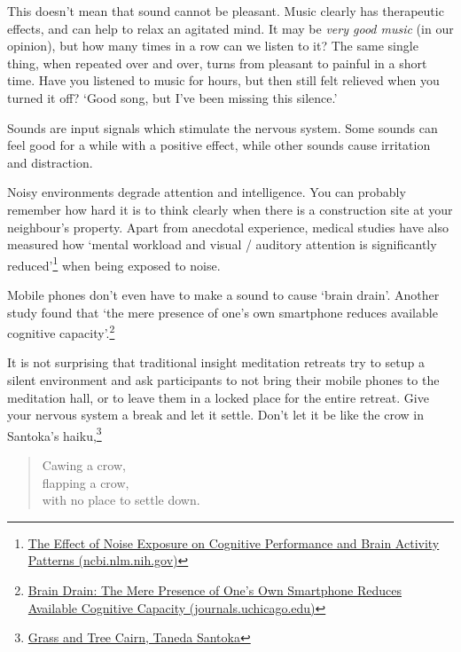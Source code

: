 
\noindent This doesn't mean that sound cannot be pleasant. Music clearly
has therapeutic effects, and can help to relax an agitated mind. It may
be \emph{very good music} (in our opinion), but how many times in a row
can we listen to it? The same single thing, when repeated over and over,
turns from pleasant to painful in a short time. Have you listened to
music for hours, but then still felt relieved when you turned it off?
`Good song, but I've been missing this silence.'

Sounds are input signals which stimulate the nervous system. Some sounds
can feel good for a while with a positive effect, while other sounds
cause irritation and distraction.

Noisy environments degrade attention and intelligence. You can probably
remember how hard it is to think clearly when there is a construction
site at your neighbour's property. Apart from anecdotal experience,
medical studies have also measured how `mental workload and visual /
auditory attention is significantly reduced'\footnote{\href{https://www.ncbi.nlm.nih.gov/pmc/articles/PMC6901841/}{The
  Effect of Noise Exposure on Cognitive Performance and Brain Activity
  Patterns (ncbi.nlm.nih.gov)}} when being exposed to noise.

\enlargethispage*{\baselineskip}

Mobile phones don't even have to make a sound to cause `brain drain'.
Another study found that `the mere presence of one's own smartphone
reduces available cognitive capacity'.\footnote{\href{https://www.journals.uchicago.edu/doi/10.1086/691462}{Brain
  Drain: The Mere Presence of One's Own Smartphone Reduces Available
  Cognitive Capacity (journals.uchicago.edu)}}

It is not surprising that traditional insight meditation retreats try to
setup a silent environment and ask participants to not bring their
mobile phones to the meditation hall, or to leave them in a locked place
for the entire retreat. Give your nervous system a break and let it
settle. Don't let it be like the crow in Santoka's haiku,\footnote{\href{https://www.goodreads.com/book/show/931086.Grass_and_Tree_Cairn}{Grass
  and Tree Cairn, Taneda Santoka}}

\begin{quote}
Cawing a crow,\\
flapping a crow,\\
with no place to settle down.
\end{quote}

